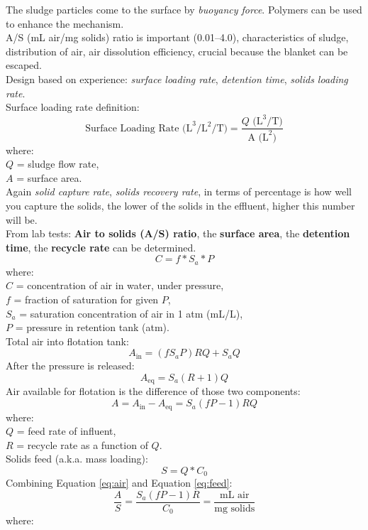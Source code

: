 \documentclass{article}
\numberwithin{equation}{section}
\begin{document}
The sludge particles come to the surface by \emph{buoyancy force}. Polymers can be used to enhance the mechanism.\\
A/S (mL air/mg solids) ratio is important (0.01--4.0), characteristics of sludge, distribution of air, air dissolution efficiency, crucial because the blanket can be escaped.\\
Design based on experience: \emph{surface loading rate}, \emph{detention time}, \emph{solids loading rate}.\\
Surface loading rate definition:
\[
\text {Surface Loading Rate} \text{ (L}^3/\text{L}^2/\text{T)} = \frac{Q\text{ (L}^3\text{/T)}}{\text{A (L}^2\text{)}} 
\]
where:\\
$Q$ = sludge flow rate,\\
$A$ = surface area.\\
Again \emph{solid capture rate}, \emph{solids recovery rate}, in terms of percentage is how well you capture the solids, the lower of the solids in the effluent, higher this number will be.\\
From lab tests: \textbf{Air to solids (A/S) ratio}, the \textbf{surface area}, the \textbf{detention time}, the \textbf{recycle rate} can be determined.
\[
C = f * S_a * P
\]
where:\\
$C$ = concentration of air in water, under pressure,\\
$f$ = fraction of saturation for given $P$,\\
$S_a$ = saturation concentration of air in 1 atm (mL/L),\\
$P$ = pressure in retention tank (atm).\\
Total air into flotation tank:
\[
A_{\text{in}} = (fS_aP)RQ+S_aQ
\]
After the pressure is released:
\[
A_{\text{eq}} = S_a(R+1)Q
\]
Air available for flotation is the difference of those two components:
\begin{equation}
    A = A_{\text{in}} - A_{\text{eq}}= S_a(fP-1)RQ \label{eq:air}
\end{equation}
where:\\
$Q$ = feed rate of influent,\\
$R$ = recycle rate as a function of $Q$.\\
Solids feed (a.k.a. mass loading):
\begin{equation}
    S = Q*C_0 \label{eq:feed}
\end{equation}
Combining Equation \ref{eq:air} and Equation \ref{eq:feed}:
\[
\frac{A}{S} = \frac{S_a(fP-1)R}{C_0} = \frac{\text{mL air}}{\text{mg solids}}
\]
where:\\
\end{document}
